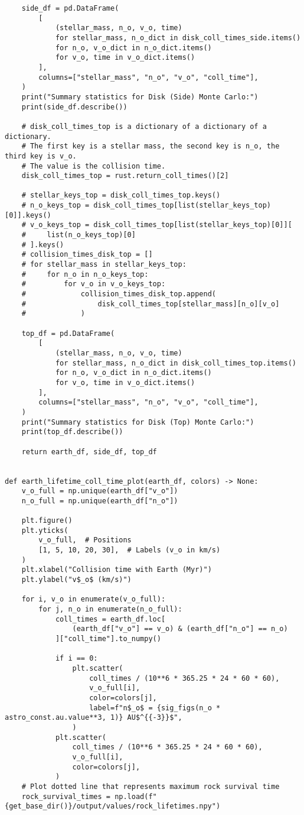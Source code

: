\begin{lstlisting}
    side_df = pd.DataFrame(
        [
            (stellar_mass, n_o, v_o, time)
            for stellar_mass, n_o_dict in disk_coll_times_side.items()
            for n_o, v_o_dict in n_o_dict.items()
            for v_o, time in v_o_dict.items()
        ],
        columns=["stellar_mass", "n_o", "v_o", "coll_time"],
    )
    print("Summary statistics for Disk (Side) Monte Carlo:")
    print(side_df.describe())

    # disk_coll_times_top is a dictionary of a dictionary of a dictionary.
    # The first key is a stellar mass, the second key is n_o, the third key is v_o.
    # The value is the collision time.
    disk_coll_times_top = rust.return_coll_times()[2]

    # stellar_keys_top = disk_coll_times_top.keys()
    # n_o_keys_top = disk_coll_times_top[list(stellar_keys_top)[0]].keys()
    # v_o_keys_top = disk_coll_times_top[list(stellar_keys_top)[0]][
    #     list(n_o_keys_top)[0]
    # ].keys()
    # collision_times_disk_top = []
    # for stellar_mass in stellar_keys_top:
    #     for n_o in n_o_keys_top:
    #         for v_o in v_o_keys_top:
    #             collision_times_disk_top.append(
    #                 disk_coll_times_top[stellar_mass][n_o][v_o]
    #             )

    top_df = pd.DataFrame(
        [
            (stellar_mass, n_o, v_o, time)
            for stellar_mass, n_o_dict in disk_coll_times_top.items()
            for n_o, v_o_dict in n_o_dict.items()
            for v_o, time in v_o_dict.items()
        ],
        columns=["stellar_mass", "n_o", "v_o", "coll_time"],
    )
    print("Summary statistics for Disk (Top) Monte Carlo:")
    print(top_df.describe())

    return earth_df, side_df, top_df


def earth_lifetime_coll_time_plot(earth_df, colors) -> None:
    v_o_full = np.unique(earth_df["v_o"])
    n_o_full = np.unique(earth_df["n_o"])

    plt.figure()
    plt.yticks(
        v_o_full,  # Positions
        [1, 5, 10, 20, 30],  # Labels (v_o in km/s)
    )
    plt.xlabel("Collision time with Earth (Myr)")
    plt.ylabel("v$_o$ (km/s)")

    for i, v_o in enumerate(v_o_full):
        for j, n_o in enumerate(n_o_full):
            coll_times = earth_df.loc[
                (earth_df["v_o"] == v_o) & (earth_df["n_o"] == n_o)
            ]["coll_time"].to_numpy()

            if i == 0:
                plt.scatter(
                    coll_times / (10**6 * 365.25 * 24 * 60 * 60),
                    v_o_full[i],
                    color=colors[j],
                    label=f"n$_o$ = {sig_figs(n_o * astro_const.au.value**3, 1)} AU$^{{-3}}$",
                )
            plt.scatter(
                coll_times / (10**6 * 365.25 * 24 * 60 * 60),
                v_o_full[i],
                color=colors[j],
            )
    # Plot dotted line that represents maximum rock survival time
    rock_survival_times = np.load(f"{get_base_dir()}/output/values/rock_lifetimes.npy")


\end{lstlisting}
